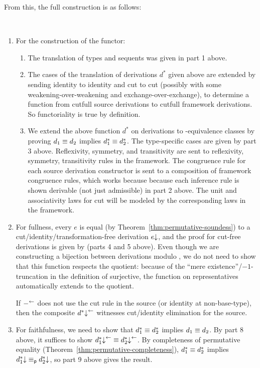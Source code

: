 From this, the full construction is as follows:
\begin{remark} ~
\begin{enumerate}
\item For the construction of the functor:
\begin{enumerate}
\item The translation of types and sequents was given in part 1 above.

\item The cases of the translation of derivations $d^*$ given above are
  extended by sending identity to identity and cut to cut (possibly with
  some weakening-over-weakening and exchange-over-exchange), to
  determine a function from cutfull source derivations to cutfull
  framework derivations.  So functoriality is true by definition.  

\item We extend the above function $d^*$ on derivations to
  \deq-equivalence classes by proving $d_1 \equiv d_2$ implies $d_1^* \equiv
  d_2^*$.  The type-specific cases are given by part 3 above.
  Reflexivity, symmetry, and transitivity are sent to reflexivity,
  symmetry, transitivity rules in the framework. The congruence rule for
  each source derivation constructor is sent to a composition of
  framework congruence rules, which works because because each inference
  rule is shown derivable (not just admissible) in part 2 above. The
  unit and associativity laws for cut will be modeled by the
  corresponding laws in the framework.  
\end{enumerate}

\item For fullness, every $e$ is equal (by
  Theorem~\ref{thm:permutative-soundess}) to a
  cut/identity/transformation-free derivation $e\mathord{\downarrow}$, and the proof
  for cut-free derivations is given by \backtrf{-} (parts 4 and 5
  above).  Even though we are constructing a bijection between
  derivations modulo \deq, we do not need to show that this function
  respects the quotient: because of the ``mere
  existence''/$-1$-truncation in the definition of surjective, the
  function on representatives automatically extends to the quotient.

  If $-^{\leftarrow}$ does not use the cut rule in the source (or identity
  at non-base-type), then the composite $d^*\mathord{\downarrow}^{\leftarrow}$ 
  witnesses cut/identity elimination for the source.  

\item For faithfulness, we need to show that $d_1^* \equiv d_2^*$ implies
  $d_1 \equiv d_2$.  By part 8 above, it suffices to show 
  $d_1^*\mathord{\downarrow}^{\leftarrow} \equiv d_2^*\mathord{\downarrow}^{\leftarrow}$.
  By completeness of permutative equality
  (Theorem~\ref{thm:permutative-completeness}), 
  $d_1^* \equiv d_2^*$ implies $d_1^*\mathord{\downarrow} \equiv_{\mathsf{p}} d_2^*\mathord{\downarrow}$,
  so part 9 above gives the result.
\end{enumerate}
\end{remark}

